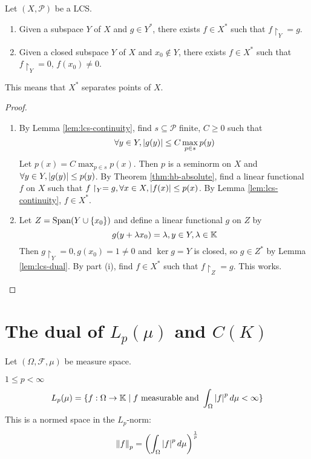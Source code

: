 \documentclass{article}
\begin{document}
\begin{nthm}\label{thm:hb-lcs}
  Let $(X, \mathcal P)$ be a LCS.
  \begin{enumerate}
    \item Given a subspace $Y$ of $X$ and $g \in Y^*$, there exists $f \in X^*$ such that $f\restriction_Y = g$.
    \item Given a closed subspace $Y$ of $X$ and $x_0 \nin Y$, there exists $f \in X^*$ such that $f\restriction_Y = 0$, $f(x_0) \ne 0$.
  \end{enumerate}
\end{nthm}
\begin{rmk}
  This means that $X^*$ separates points of $X$.
\end{rmk}
\begin{proof}~
  \begin{enumerate}
    \item By Lemma \ref{lem:lcs-continuity}, find $s \subseteq \mathcal P$ finite, $C \ge 0$ such that
    $$\forall y \in Y, \left\lvert g(y)\right\rvert \le C\max_{p \in s}p(y)$$
    Let $p(x) = C\max_{p \in s}p(x)$. Then $p$ is a seminorm on $X$ and $\forall y \in Y, \left\lvert g(y)\right\rvert \le p(y)$. By Theorem \ref{thm:hb-absolute}, find a linear functional $f$ on $X$ such that $f\restriction_Y = g, \forall x \in X, \left\lvert f(x)\right\rvert \le p(x)$. By Lemma \ref{lem:lcs-continuity}, $f \in X^*$.
    \item Let $Z = \mathrm{Span}(Y \cup \{x_0\})$ and define a linear functional $g$ on $Z$ by
    $$g(y + \lambda x_0) = \lambda, y \in Y, \lambda \in \mathbb K$$
    Then $g\restriction_Y = 0, g(x_0) = 1 \ne 0$ and $\ker g = Y$ is closed, so $g \in Z^*$ by Lemma \ref{lem:lcs-dual}. By part (i), find $f \in X^*$ such that $f\restriction_Z = g$. This works.
  \end{enumerate}
\end{proof}

\clearpage

\section{The dual of \texorpdfstring{$L_p(\mu)$ and $C(K)$}{Lp(mu) or C(K)}}

Let $(\Omega, \mathcal F, \mu)$ be measure space.

$1 \le p < \infty$
$$L_p(\mu) = \{f : \Omega \rightarrow \mathbb K \mid f \text{ measurable and } \int_\Omega \left\lvert f\right\rvert^p d\mu < \infty\}$$
This is a normed space in the $L_p$-norm:
$$\left\lVert f\right\rVert_p = \left(\int_\Omega \left\lvert f\right\rvert^p d\mu\right)^{\frac 1p}$$
\end{document}
